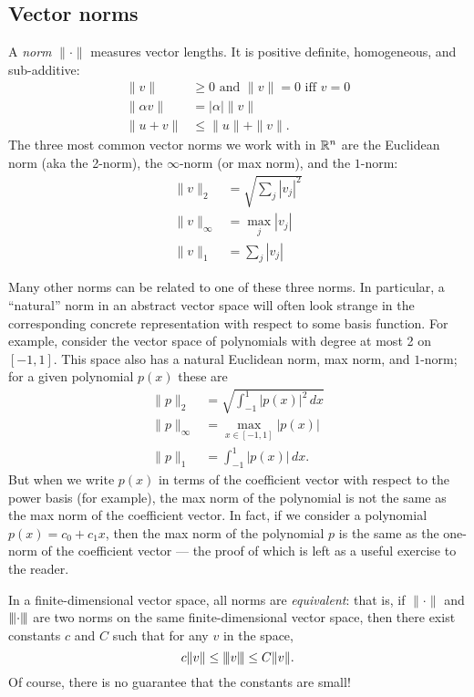 \documentclass[12pt, leqno]{article}
\begin{document}
\subsection{Vector norms}

A {\em norm} $\|\cdot\|$ measures vector lengths.  It is
positive definite, homogeneous, and sub-additive:
\begin{align*}
  \|v\| & \geq 0 \mbox{ and } \|v\| = 0 \mbox{ iff } v = 0 \\
  \|\alpha v\| &= |\alpha| \|v\| \\
  \|u+v\| & \leq \|u\| + \|v\|.
\end{align*}
The three most common vector norms we work with in $\mathbb{R}^n$ are the
Euclidean norm (aka the 2-norm), the $\infty$-norm (or max norm),
and the $1$-norm:
\begin{align*}
  \|v\|_2 &= \sqrt{\sum_j |v_j|^2} \\
  \|v\|_\infty &= \max_j |v_j| \\
  \|v\|_1 &= \sum_j |v_j|
\end{align*}

Many other norms can be related to one of these three norms.  In
particular, a ``natural'' norm in an abstract vector space will often
look strange in the corresponding concrete representation with respect
to some basis function.  For example, consider the vector space of
polynomials with degree at most 2 on $[-1,1]$.  This space also has
a natural Euclidean norm, max norm, and $1$-norm; for a given
polynomial $p(x)$ these are
\begin{align*}
  \|p\|_2 &= \sqrt{ \int_{-1}^1 |p(x)|^2 \, dx } \\
  \|p\|_\infty &= \max_{x \in [-1,1]} |p(x)| \\
  \|p\|_1 &= \int_{-1}^1 |p(x)| \, dx.
\end{align*}
But when we write $p(x)$ in terms of the coefficient vector with
respect to the power basis (for example), the max norm of the
polynomial is not the same as the max norm of the coefficient vector.
In fact, if we consider a polynomial $p(x) = c_0 + c_1 x$, then
the max norm of the polynomial $p$ is the same as the one-norm of the
coefficient vector --- the proof of which is left as a useful exercise
to the reader.

In a finite-dimensional vector space, all norms are {\em equivalent}:
that is, if $\|\cdot\|$ and ${\left\vert\kern-0.25ex\left\vert\kern-0.25ex\left\vert \cdot \right\vert\kern-0.25ex\right\vert\kern-0.25ex\right\vert}$ are two norms on the
same finite-dimensional vector space, then there exist constants $c$
and $C$ such that for any $v$ in the space,
\[
  c \|v\| \leq {\left\vert\kern-0.25ex\left\vert\kern-0.25ex\left\vert v \right\vert\kern-0.25ex\right\vert\kern-0.25ex\right\vert} \leq C \|v\|.
\]
Of course, there is no guarantee that the constants are small!
\end{document}

